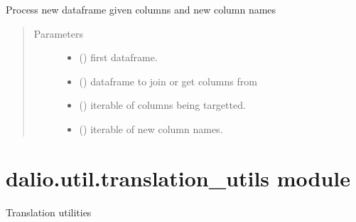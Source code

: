 \documentclass[letterpaper,10pt,english]{sphinxmanual}
\begin{document}
\begin{fulllineitems}
\label{\detokenize{dalio.util:dalio.util.processing_utils.process_new_df}}
Process new dataframe given columns and new column names
\begin{quote}\begin{description}
\item[{Parameters}] \leavevmode\begin{itemize}
\item {} 
 () \textendash{} first dataframe.

\item {} 
 () \textendash{} dataframe to join or get columns from

\item {} 
 () \textendash{} iterable of columns being targetted.

\item {} 
 () \textendash{} iterable of new column names.

\end{itemize}

\end{description}\end{quote}

\end{fulllineitems}



\section{dalio.util.translation\_utils module}
\label{\detokenize{dalio.util:module-dalio.util.translation_utils}}\label{\detokenize{dalio.util:dalio-util-translation-utils-module}}
Translation utilities
\end{document}
